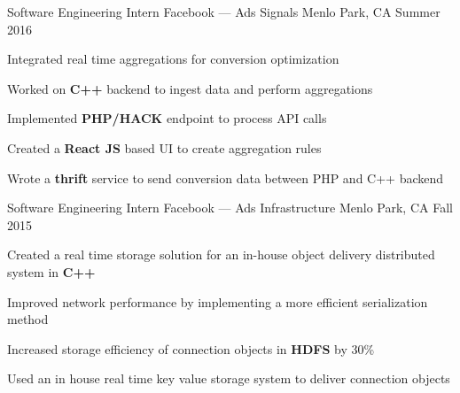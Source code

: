 


\begin{cventries}


\cventry
{Software Engineering Intern} %
{{\color{facebookblue}Facebook} --- Ads Signals} %
{Menlo Park, CA} %
{Summer 2016} %
{ %
\begin{cvitems}
\item {Integrated real time aggregations for conversion optimization}
\item {Worked on \textbf{C++} backend to ingest data and perform aggregations}
\item {Implemented \textbf{PHP/HACK} endpoint to process API calls}
\item {Created a \textbf{React JS} based UI to create aggregation rules}
\item {Wrote a \textbf{thrift} service to send conversion data between PHP and C++ backend}
\end{cvitems}
}


\cventry
{Software Engineering Intern} %
{{\color{facebookblue}Facebook} --- Ads Infrastructure} %
{Menlo Park, CA} %
{Fall 2015} %
{ %
\begin{cvitems}
\item {Created a real time storage solution for an in-house object delivery distributed system in \textbf{C++}}
\item {Improved network performance by implementing a more efficient serialization method}
\item {Increased storage efficiency of connection objects in \textbf{HDFS} by 30\%}
\item {Used an in house real time key value storage system to deliver connection objects}
\end{cvitems}
}


\end{cventries}
